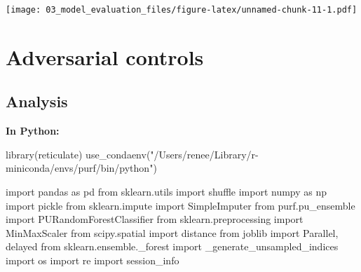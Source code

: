 \documentclass[
  11pt,
  oneside]{book}
\newenvironment{Shaded}{\begin{snugshade}}{\end{snugshade}}
\newcommand{\FunctionTok}[1]{\textcolor[rgb]{0.00,0.00,0.00}{#1}}
\newcommand{\ImportTok}[1]{#1}
\newcommand{\NormalTok}[1]{#1}
\newcommand{\StringTok}[1]{\textcolor[rgb]{0.31,0.60,0.02}{#1}}
\begin{document}
\texttt{[image: 03\_model\_evaluation\_files/figure-latex/unnamed-chunk-11-1.pdf]}

\hypertarget{adversarial-controls}{%
\section{Adversarial controls}\label{adversarial-controls}}

\hypertarget{analysis-2}{%
\subsection{Analysis}\label{analysis-2}}

\textbf{In Python: }

\begin{Shaded}
\begin{Highlighting}[]
\FunctionTok{library}\NormalTok{(reticulate)}
\FunctionTok{use\_condaenv}\NormalTok{(}\StringTok{"/Users/renee/Library/r{-}miniconda/envs/purf/bin/python"}\NormalTok{)}
\end{Highlighting}
\end{Shaded}

\begin{Shaded}
\begin{Highlighting}[]
\ImportTok{import}\NormalTok{ pandas }\ImportTok{as}\NormalTok{ pd}
\ImportTok{from}\NormalTok{ sklearn.utils }\ImportTok{import}\NormalTok{ shuffle}
\ImportTok{import}\NormalTok{ numpy }\ImportTok{as}\NormalTok{ np}
\ImportTok{import}\NormalTok{ pickle}
\ImportTok{from}\NormalTok{ sklearn.impute }\ImportTok{import}\NormalTok{ SimpleImputer}
\ImportTok{from}\NormalTok{ purf.pu\_ensemble }\ImportTok{import}\NormalTok{ PURandomForestClassifier}
\ImportTok{from}\NormalTok{ sklearn.preprocessing }\ImportTok{import}\NormalTok{ MinMaxScaler}
\ImportTok{from}\NormalTok{ scipy.spatial }\ImportTok{import}\NormalTok{ distance}
\ImportTok{from}\NormalTok{ joblib }\ImportTok{import}\NormalTok{ Parallel, delayed}
\ImportTok{from}\NormalTok{ sklearn.ensemble.\_forest }\ImportTok{import}\NormalTok{ \_generate\_unsampled\_indices}
\ImportTok{import}\NormalTok{ os}
\ImportTok{import}\NormalTok{ re}
\ImportTok{import}\NormalTok{ session\_info}
\end{Highlighting}
\end{Shaded}
\end{document}

